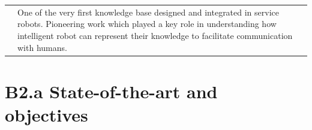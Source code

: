 \documentclass[11pt,a4paper]{report}
\begin{document}
\begin{tabular}{p{1.7cm}p{7cm}p{8cm}}
    & \small One of the very first knowledge base designed and
    integrated in service robots. Pioneering work which played a key role in
    understanding how intelligent robot can represent their
    knowledge to facilitate communication with humans.
    \textbf{}\\

\end{tabular}



%









\newpage
\newrefsection
\chapter{B2.a State-of-the-art and objectives}
\end{document}

